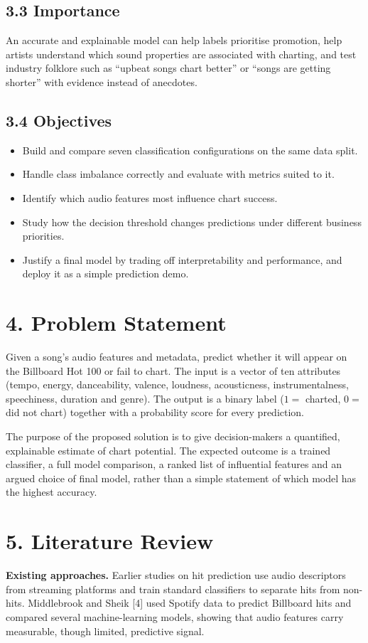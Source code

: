 \documentclass[11pt,a4paper]{article}
\begin{document}
\subsection*{3.3 Importance}
An accurate and explainable model can help labels prioritise promotion, help artists understand which sound properties are associated with charting, and test industry folklore such as ``upbeat songs chart better'' or ``songs are getting shorter'' with evidence instead of anecdotes.

\subsection*{3.4 Objectives}
\begin{itemize}
  \item Build and compare seven classification configurations on the same data split.
  \item Handle class imbalance correctly and evaluate with metrics suited to it.
  \item Identify which audio features most influence chart success.
  \item Study how the decision threshold changes predictions under different business priorities.
  \item Justify a final model by trading off interpretability and performance, and deploy it as a simple prediction demo.
\end{itemize}

\section*{4. Problem Statement}
Given a song's audio features and metadata, predict whether it will appear on the Billboard Hot 100 or fail to chart. The input is a vector of ten attributes (tempo, energy, danceability, valence, loudness, acousticness, instrumentalness, speechiness, duration and genre). The output is a binary label ($1 =$ charted, $0 =$ did not chart) together with a probability score for every prediction.

The purpose of the proposed solution is to give decision-makers a quantified, explainable estimate of chart potential. The expected outcome is a trained classifier, a full model comparison, a ranked list of influential features and an argued choice of final model, rather than a simple statement of which model has the highest accuracy.

\section*{5. Literature Review}
\textbf{Existing approaches.} Earlier studies on hit prediction use audio descriptors from streaming platforms and train standard classifiers to separate hits from non-hits. Middlebrook and Sheik [4] used Spotify data to predict Billboard hits and compared several machine-learning models, showing that audio features carry measurable, though limited, predictive signal.
\end{document}
